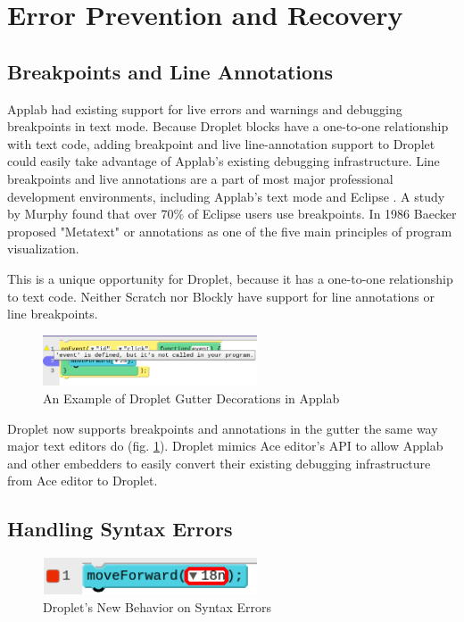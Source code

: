 \documentclass[conference]{IEEEtran}
\begin{document}
\section{Error Prevention and Recovery}

\subsection{Breakpoints and Line Annotations}

Applab had existing support for live errors and warnings and debugging breakpoints in text mode. Because Droplet blocks have a one-to-one relationship with text code, adding breakpoint and live line-annotation support to Droplet could easily take advantage of Applab's existing debugging infrastructure. Line breakpoints and live annotations are a part of most major professional development environments, including Applab's text mode and Eclipse \cite{Eclipse}. A study by Murphy \cite{Murphy} found that over 70\% of Eclipse users use breakpoints. In 1986 Baecker \cite{Baecker} proposed "Metatext" or annotations as one of the five main principles of program visualization.

This is a unique opportunity for Droplet, because it has a one-to-one relationship to text code. Neither Scratch nor Blockly have support for line annotations or line breakpoints.

\begin{figure}
\centering
\includegraphics[width=2.5in]{breakpoint_annotations.png}
\caption{An Example of Droplet Gutter Decorations in Applab}
\label{breakpoints}
\end{figure}

Droplet now supports breakpoints and annotations in the gutter the same way major text editors do (fig. \ref{breakpoints}). Droplet mimics Ace editor's API to allow Applab and other embedders to easily convert their existing debugging infrastructure from Ace editor to Droplet.

\subsection{Handling Syntax Errors}

\begin{figure}
\centering
\includegraphics[width=2.5in]{error-outline.png}
\caption{Droplet's New Behavior on Syntax Errors}
\label{error}
\end{figure}
\end{document}
